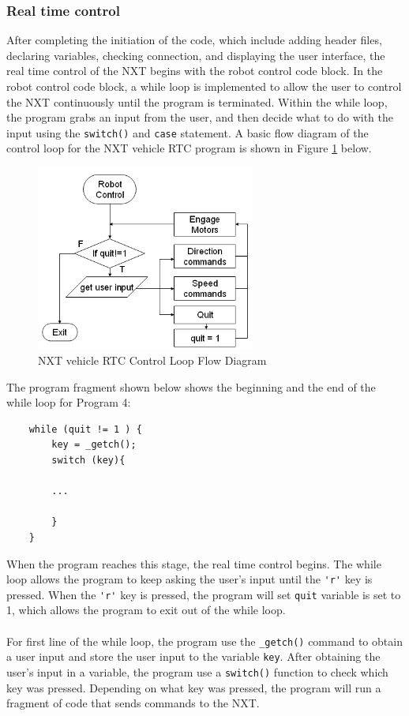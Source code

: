 \subsubsection*{Real time control}
After completing the initiation of the code, which include adding header files, declaring variables,
checking connection, and displaying the user interface, the real time control of the NXT begins with 
the robot control code block. In the robot control code block, a while loop is implemented to allow 
the user to control the NXT continuously until the program is terminated. Within the while loop, the 
program grabs an input from the user, and then decide what to do with the input using the 
\verb+switch()+ and \verb+case+ statement. A basic flow diagram of the control loop for the NXT 
vehicle RTC program is shown in Figure \ref{fig_RTC_controlloop} below.\\
    
\begin{figure}[h]
  \begin{center}
    \includegraphics[height=2.4in]{figure/mindstorm/RTC_controlloop.png}
    \caption{NXT vehicle RTC Control Loop Flow Diagram \label{fig_RTC_controlloop}}
  \end{center}
\end{figure}

\noindent
The program fragment shown below shows the beginning and the end of the while loop for Program 4:
\begin{verbatim}
    while (quit != 1 ) {
        key = _getch();
        switch (key){
        
        ...
        
        }
    }
\end{verbatim}
\noindent
When the program reaches this stage, the real time control begins. The while loop allows the program 
to keep asking the user's input until the \verb+'r'+ key is pressed. When the \verb+'r'+ key is 
pressed, the program will set \verb+quit+ variable is set to 1, which allows the program to exit 
out of the while loop.\\ \\
\noindent
For first line of the while loop, the program use the \verb+_getch()+ command to obtain a user
input and store the user input to the variable \verb+key+. After obtaining the user's input in a 
variable, the program use a \verb+switch()+ function to check which key was pressed. Depending on 
what key was pressed, the program will run a fragment of code that sends commands to the NXT.

